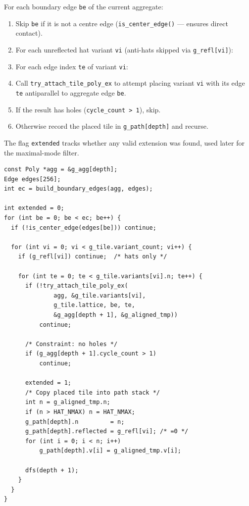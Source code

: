 \documentclass[10pt,a4paper]{article}
\newcommand{\code}[1]{\texttt{\small #1}}
\begin{document}
\begin{tcolorbox}[dualbox, title={Tile Attachment — Extension Loop}]
  For each boundary edge \code{be} of the current aggregate:
  \begin{enumerate}
    \item Skip \code{be} if it is not a centre edge
      (\code{is\_center\_edge()} — ensures direct contact).
    \item For each unreflected hat variant \code{vi}
      (anti-hats skipped via \code{g\_refl[vi]}):
    \item For each edge index \code{te} of variant \code{vi}:
    \item Call \code{try\_attach\_tile\_poly\_ex} to attempt
      placing variant \code{vi} with its edge \code{te}
      antiparallel to aggregate edge \code{be}.
    \item If the result has holes (\code{cycle\_count > 1}), skip.
    \item Otherwise record the placed tile in \code{g\_path[depth]}
      and recurse.
  \end{enumerate}
  The flag \code{extended} tracks whether any valid extension was found,
  used later for the maximal-mode filter.
\tcblower
\begin{verbatim}
const Poly *agg = &g_agg[depth];
Edge edges[256];
int ec = build_boundary_edges(agg, edges);

int extended = 0;
for (int be = 0; be < ec; be++) {
  if (!is_center_edge(edges[be])) continue;

  for (int vi = 0; vi < g_tile.variant_count; vi++) {
    if (g_refl[vi]) continue;  /* hats only */

    for (int te = 0; te < g_tile.variants[vi].n; te++) {
      if (!try_attach_tile_poly_ex(
              agg, &g_tile.variants[vi],
              g_tile.lattice, be, te,
              &g_agg[depth + 1], &g_aligned_tmp))
          continue;

      /* Constraint: no holes */
      if (g_agg[depth + 1].cycle_count > 1)
          continue;

      extended = 1;
      /* Copy placed tile into path stack */
      int n = g_aligned_tmp.n;
      if (n > HAT_NMAX) n = HAT_NMAX;
      g_path[depth].n         = n;
      g_path[depth].reflected = g_refl[vi]; /* =0 */
      for (int i = 0; i < n; i++)
          g_path[depth].v[i] = g_aligned_tmp.v[i];

      dfs(depth + 1);
    }
  }
}
\end{verbatim}
\end{tcolorbox}
\end{document}
